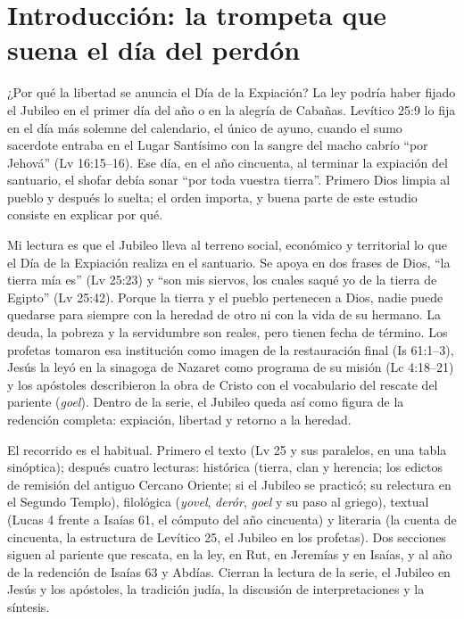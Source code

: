 \documentclass[11pt,letterpaper]{article}
\begin{document}
\section{Introducción: la trompeta que suena el día del perdón}

¿Por qué la libertad se anuncia el Día de la Expiación? La ley podría haber fijado el Jubileo en el primer día del año o en la alegría de Cabañas. Levítico 25:9 lo fija en el día más solemne del calendario, el único de ayuno, cuando el sumo sacerdote entraba en el Lugar Santísimo con la sangre del macho cabrío ``por Jehová'' (Lv 16:15--16). Ese día, en el año cincuenta, al terminar la expiación del santuario, el shofar debía sonar ``por toda vuestra tierra''. Primero Dios limpia al pueblo y después lo suelta; el orden importa, y buena parte de este estudio consiste en explicar por qué.

Mi lectura es que el Jubileo lleva al terreno social, económico y territorial lo que el Día de la Expiación realiza en el santuario. Se apoya en dos frases de Dios, ``la tierra mía es'' (Lv 25:23) y ``son mis siervos, los cuales saqué yo de la tierra de Egipto'' (Lv 25:42). Porque la tierra y el pueblo pertenecen a Dios, nadie puede quedarse para siempre con la heredad de otro ni con la vida de su hermano. La deuda, la pobreza y la servidumbre son reales, pero tienen fecha de término. Los profetas tomaron esa institución como imagen de la restauración final (Is 61:1--3), Jesús la leyó en la sinagoga de Nazaret como programa de su misión (Lc 4:18--21) y los apóstoles describieron la obra de Cristo con el vocabulario del rescate del pariente (\emph{goel}). Dentro de la serie, el Jubileo queda así como figura de la redención completa: expiación, libertad y retorno a la heredad.

El recorrido es el habitual. Primero el texto (Lv 25 y sus paralelos, en una tabla sinóptica); después cuatro lecturas: histórica (tierra, clan y herencia; los edictos de remisión del antiguo Cercano Oriente; si el Jubileo se practicó; su relectura en el Segundo Templo), filológica (\emph{yovel}, \emph{derór}, \emph{goel} y su paso al griego), textual (Lucas 4 frente a Isaías 61, el cómputo del año cincuenta) y literaria (la cuenta de cincuenta, la estructura de Levítico 25, el Jubileo en los profetas). Dos secciones siguen al pariente que rescata, en la ley, en Rut, en Jeremías y en Isaías, y al año de la redención de Isaías 63 y Abdías. Cierran la lectura de la serie, el Jubileo en Jesús y los apóstoles, la tradición judía, la discusión de interpretaciones y la síntesis.
\end{document}

